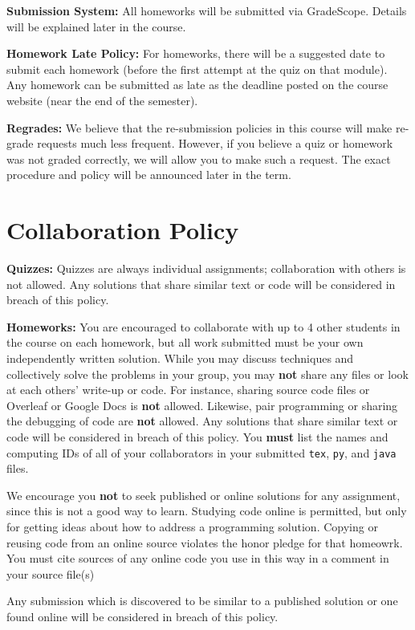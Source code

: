 \documentclass[12pt]{article}
\begin{document}
\textbf{Submission System:} All homeworks will be submitted via GradeScope. Details will be explained later in the course. 

\textbf{Homework Late Policy:} For homeworks, there will be a suggested date to submit each homework (before the first attempt at the quiz on that module). Any homework can be submitted as late as the deadline posted on the course website (near the end of the semester).

\textbf{Regrades:} We believe that the re-submission policies in this course will make re-grade requests much less frequent.  However, if you believe a quiz or homework was not graded correctly, we will allow you to make such a request. The exact procedure and policy will be announced later in the term.

\section*{Collaboration Policy}

\textbf{Quizzes:} Quizzes are always individual assignments; collaboration with others is not allowed.  Any solutions that share similar text or code will be considered in breach of this policy.

\textbf{Homeworks:} You are encouraged to collaborate with up to 4 other students in the course on each homework, but all work submitted must be your own independently written solution.  While you may discuss techniques and collectively solve the problems in your group, you may \textbf{not} share any files or look at each others' write-up or code. For instance, sharing source code files or Overleaf or Google Docs is \textbf{not} allowed.  Likewise, pair programming or sharing the debugging of code are \textbf{not} allowed.  Any solutions that share similar text or code will be considered in breach of this policy. You \textbf{must} list the names and computing IDs of all of your collaborators in your submitted \texttt{tex}, \texttt{py}, and \texttt{java} files.

We encourage you \textbf{not} to seek published or online solutions for any assignment, since this is not a good way to learn. Studying code online is permitted, but only for getting ideas about how to address a programming solution. 
Copying or reusing code from an online source violates the honor pledge for that homeowrk. 
You must cite sources of any online code you use in this way in a comment in your source file(s)

Any submission which is discovered to be similar to a published solution or one found online will be considered in breach of this policy.
\end{document}
